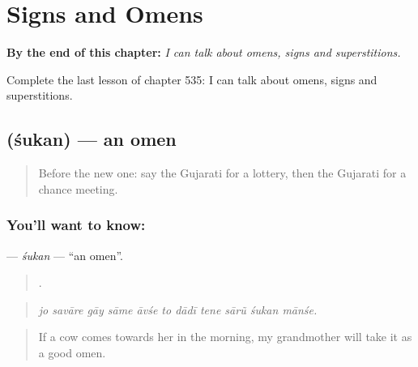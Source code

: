 
\chapter{Signs and Omens}
\label{ch:gu-signs-and-omens}

\begin{chapteropening}
\textbf{By the end of this chapter:} \emph{I can talk about omens, signs and superstitions.}

Complete the last lesson of chapter 535: I can talk about omens, signs and superstitions.
\end{chapteropening}

\section[\texorpdfstring{\gu{શુકન} (śukan)}{શુકન (śukan)}]{ (śukan) — an omen}

\label{lesson:GU-C535-sukan}



\begin{quote}
Before the new one: say the Gujarati for a lottery, then the Gujarati for a chance meeting.
\end{quote}

\subsection*{You'll want to know: }
\textbf{} — \emph{śukan} — \textquotedblleft{}an omen\textquotedblright{}.

\begin{quote}
          .
\end{quote}

\begin{quote}
\emph{jo savāre gāy sāme āvśe to dādī tene sārũ śukan mānśe.}
\end{quote}

\begin{quote}
If a cow comes towards her in the morning, my grandmother will take it as a good omen.
\end{quote}

